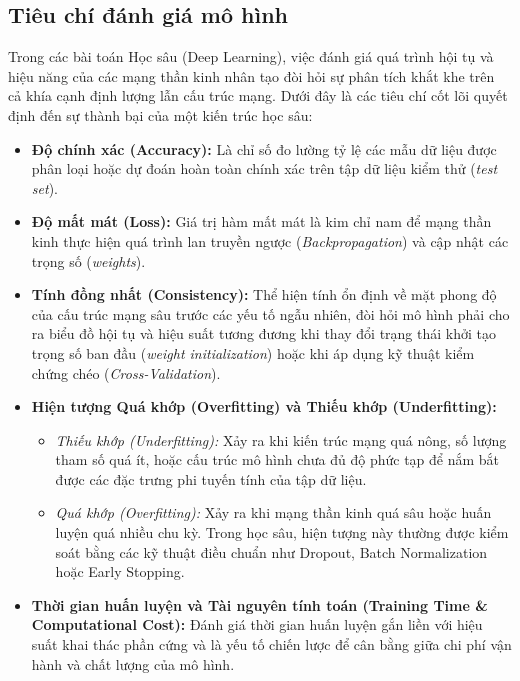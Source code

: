 \documentclass[a4paper,12pt]{article}
\begin{document}
\subsection{Tiêu chí đánh giá mô hình}
Trong các bài toán Học sâu (Deep Learning), việc đánh giá quá trình hội tụ và hiệu năng của các mạng thần kinh nhân tạo đòi hỏi sự phân tích khắt khe trên cả khía cạnh định lượng lẫn cấu trúc mạng. Dưới đây là các tiêu chí cốt lõi quyết định đến sự thành bại của một kiến trúc học sâu:

\begin{itemize}
    \item \textbf{Độ chính xác (Accuracy):} Là chỉ số đo lường tỷ lệ các mẫu dữ liệu được phân loại hoặc dự đoán hoàn toàn chính xác trên tập dữ liệu kiểm thử (\textit{test set}).

    \item \textbf{Độ mất mát (Loss):} Giá trị hàm mất mát là kim chỉ nam để mạng thần kinh thực hiện quá trình lan truyền ngược (\textit{Backpropagation}) và cập nhật các trọng số (\textit{weights}).

    \item \textbf{Tính đồng nhất (Consistency):} Thể hiện tính ổn định về mặt phong độ của cấu trúc mạng sâu trước các yếu tố ngẫu nhiên, đòi hỏi mô hình phải cho ra biểu đồ hội tụ và hiệu suất tương đương khi thay đổi trạng thái khởi tạo trọng số ban đầu (\textit{weight initialization}) hoặc khi áp dụng kỹ thuật kiểm chứng chéo (\textit{Cross-Validation}).

    \item \textbf{Hiện tượng Quá khớp (Overfitting) và Thiếu khớp (Underfitting):}
    \begin{itemize}
        \item \textit{Thiếu khớp (Underfitting):} Xảy ra khi kiến trúc mạng quá nông, số lượng tham số quá ít, hoặc cấu trúc mô hình chưa đủ độ phức tạp để nắm bắt được các đặc trưng phi tuyến tính của tập dữ liệu.
        \item \textit{Quá khớp (Overfitting):} Xảy ra khi mạng thần kinh quá sâu hoặc huấn luyện quá nhiều chu kỳ. Trong học sâu, hiện tượng này thường được kiểm soát bằng các kỹ thuật điều chuẩn như Dropout, Batch Normalization hoặc Early Stopping.
    \end{itemize}

    \item \textbf{Thời gian huấn luyện và Tài nguyên tính toán (Training Time \& Computational Cost):} Đánh giá thời gian huấn luyện gắn liền với hiệu suất khai thác phần cứng và là yếu tố chiến lược để cân bằng giữa chi phí vận hành và chất lượng của mô hình.
\end{itemize}
\end{document}

